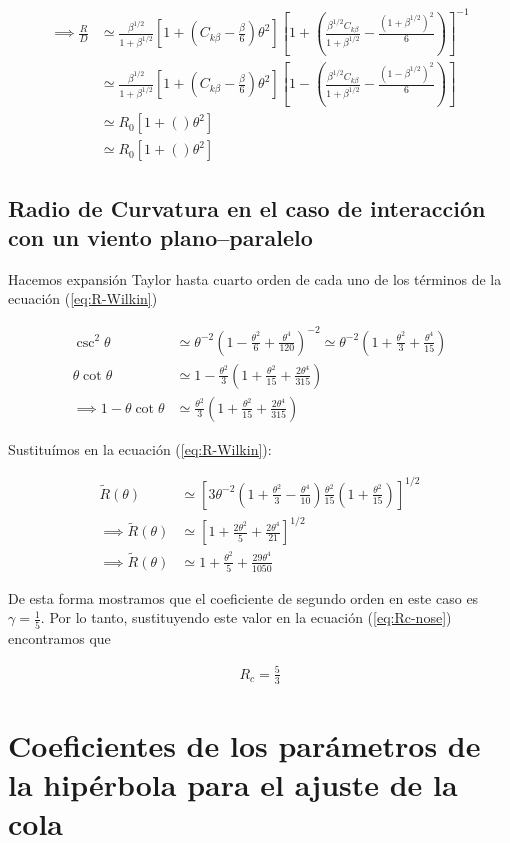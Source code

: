 \begin{align}
  \implies \frac{R}{D} &\simeq \frac{\beta^{1/2}}{1 + \beta^{1/2}}\left[1 + \left(C_{k\beta} - \frac{\beta}{6}\right)\theta^2\right]
                         \left[1 + \left(\frac{\beta^{1/2}C_{k\beta}}{1 + \beta^{1/2}} - \frac{\left(1 + \beta^{1/2}\right)^2}{6}\right)\right]^{-1} \\
  &\simeq \frac{\beta^{1/2}}{1 + \beta^{1/2}}\left[1 + \left(C_{k\beta} - \frac{\beta}{6}\right)\theta^2\right]
    \left[1 - \left(\frac{\beta^{1/2}C_{k\beta}}{1 + \beta^{1/2}} - \frac{\left(1 - \beta^{1/2}\right)^2}{6}\right)\right] \\
           &\simeq R_0\left[1 + \left(\right)\theta^2\right] \\
  &\simeq R_0 \left[1 + \left(\right)\theta^2\right] 
\end{align}

\section{Radio de Curvatura en el caso de interacción con un viento plano--paralelo}
\label{sec:Rc-Wilkin}
Hacemos expansión Taylor hasta cuarto orden de cada uno de los términos de la ecuación (\ref{eq:R-Wilkin})

\begin{align}
  \csc^2\theta &\simeq \theta^{-2}\left(1 - \frac{\theta^2}{6} + \frac{\theta^4}{120}\right)^{-2} \simeq
                 \theta^{-2}\left(1 + \frac{\theta^2}{3} + \frac{\theta^4}{15}\right) \\
  \theta\cot\theta &\simeq 1 - \frac{\theta^2}{3}\left(1 + \frac{\theta^2}{15} + \frac{2\theta^4}{315}\right) \\
  \implies 1 -\theta\cot\theta &\simeq \frac{\theta^2}{3}\left(1 + \frac{\theta^2}{15} + \frac{2\theta^4}{315}\right)
\end{align}

Sustituímos en la ecuación (\ref{eq:R-Wilkin}):

\begin{align}
  \tilde{R}(\theta) &\simeq \left[3\theta^{-2}\left(1 + \frac{\theta^2}{3}-\frac{\theta^4}{10}\right)\frac{\theta^2}{15}
  \left(1 + \frac{\theta^2}{15}\right) \right]^{1/2} \\
  \implies \tilde{R}(\theta) &\simeq \left[1 + \frac{2\theta^2}{5} + \frac{2\theta^4}{21}\right]^{1/2} \\
  \implies \tilde{R}(\theta) &\simeq 1 + \frac{\theta^2}{5} + \frac{29\theta^4}{1050}
\end{align}

De esta forma mostramos que el coeficiente de segundo orden en este caso es $\gamma = \frac{1}{5}$. Por lo tanto,
sustituyendo este valor en la ecuación (\ref{eq:Rc-nose}) encontramos que

\begin{align}
  R_c = \frac{5}{3}
\end{align}

\chapter{Coeficientes de los parámetros de la hipérbola para el ajuste de la cola}

